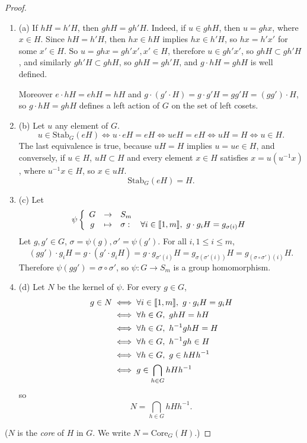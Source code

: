 \documentclass[11pt,a4paper]{article}
\def\gcro{\mbox{[\hspace{-.15em}[}}%
\def\dcro{\mbox{]\hspace{-.15em}]}}
\newcommand{\be} {\begin{enumerate}}
\newcommand{\ee} {\end{enumerate}}
\begin{document}
\begin{proof}
\be
\item[(a)] 
If $hH = h'H$, then $ghH = gh'H$. Indeed, if $u \in ghH$, then $u=ghx$, where $x \in H$. Since $hH = h'H$, then $hx \in hH$ implies $hx \in h'H$, so $hx = h'x'$ for some $x' \in H$. So $u = ghx = gh'x', x' \in H$, therefore $u \in gh'x'$, so $ghH \subset gh'H$, and similarly $gh'H \subset ghH$, so $ghH = gh'H$, and $g\cdot hH = gh H$ is well defined.

Moreover $e\cdot hH = ehH = hH$ and $g\cdot (g' \cdot H) = g \cdot g'H = gg'H = (gg')\cdot H$, so $g\cdot hH = gh H$ defines a left action of $G$ on the set of left cosets.

\item[(b)] Let $u$ any element of $G$. 
$$u \in \mathrm{Stab}_G(eH) \iff u \cdot eH = eH \iff ueH =e H \iff uH = H \iff u \in H.$$
The last equivalence is true, because $uH = H$ implies $u = ue\in H$, and conversely, if $u \in H$, $uH \subset H$ and every element $x \in H$ satisfies 
$x = u(u^{-1}x)$, where $u^{-1} x \in H$, so $x \in uH$.
$$\mathrm{Stab}_G(eH) = H.$$

\item[(c)] 
Let 
$$
\psi 
\left\{
\begin{array}{ccl}
  G& \to  &  S_m \\
  g& \mapsto  &   \sigma : \quad \forall i \in \gcro 1,m\dcro, \ g \cdot g_i H = g_{\sigma(i)} H  
\end{array}
\right.
$$
Let $g, g' \in G$, $\sigma = \psi(g), \sigma' = \psi(g')$. For all $i, 1\leq i \leq m$,
$$(gg')\cdot g_iH = g\cdot (g'\cdot g_iH) = g\cdot g_{\sigma'(i)}H = g_{\sigma(\sigma'(i))}H =g_ {(\sigma \circ \sigma')(i)} H.$$ 
Therefore $\psi(gg') = \sigma \circ \sigma'$, so $\psi:G \to S_m$ is a group homomorphism.

\item[(d)] Let $N$ be the kernel of $\psi$. For every $g \in G$,
\begin{align*}
g \in N  &\iff \forall i \in \gcro 1, m \dcro,\ g \cdot g_i H = g_iH \\
&\iff \forall h \in G, \ gh H = h H \\
&\iff \forall h \in G, \ h^{-1}gh H =  H\\
&\iff  \forall h \in G, \ h^{-1}gh \in H\\
&\iff \forall h \in G,\ g \in hHh^{-1}\\
& \iff g \in \bigcap_{h\in G} hHh^{-1}
\end{align*}
so
$$N = \bigcap_{h\in G} hHh^{-1}.$$
\ee
($N$ is the {\it core} of $H$ in $G$. We write $N = \mathrm{Core}_G(H)$.)


\end{proof}
\end{document}
